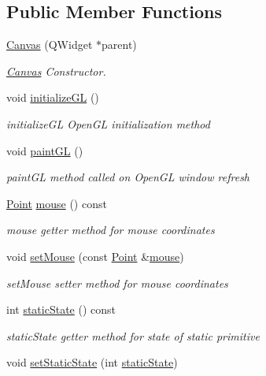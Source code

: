 \subsection*{Public Member Functions}
\begin{DoxyCompactItemize}
\item 
\hyperlink{class_canvas_a8e5bf913d99dcf0511aaa5fd8c294cde}{Canvas} (Q\+Widget $\ast$parent)
\begin{DoxyCompactList}\small\item\em \hyperlink{class_canvas}{Canvas} Constructor. \end{DoxyCompactList}\item 
void \hyperlink{class_canvas_a68622ac24f847a47270c4e6f566eec3c}{initialize\+GL} ()
\begin{DoxyCompactList}\small\item\em initialize\+GL Open\+GL initialization method \end{DoxyCompactList}\item 
void \hyperlink{class_canvas_a4e9439400dd404eda24cf42ca5ca9972}{paint\+GL} ()
\begin{DoxyCompactList}\small\item\em paint\+GL method called on Open\+GL window refresh \end{DoxyCompactList}\item 
\hyperlink{class_point}{Point} \hyperlink{class_canvas_a5c78c7a84c0f9d5540caeab66b677299}{mouse} () const
\begin{DoxyCompactList}\small\item\em mouse getter method for mouse coordinates \end{DoxyCompactList}\item 
void \hyperlink{class_canvas_a104679999425d8ffdc27454b71e5e1e3}{set\+Mouse} (const \hyperlink{class_point}{Point} \&\hyperlink{class_canvas_a5c78c7a84c0f9d5540caeab66b677299}{mouse})
\begin{DoxyCompactList}\small\item\em set\+Mouse setter method for mouse coordinates \end{DoxyCompactList}\item 
int \hyperlink{class_canvas_a63f657b762d08168f52630bc49efbf71}{static\+State} () const
\begin{DoxyCompactList}\small\item\em static\+State getter method for state of static primitive \end{DoxyCompactList}\item 
void \hyperlink{class_canvas_a6c42c7c65e5eae64c4fa1839146f0440}{set\+Static\+State} (int \hyperlink{class_canvas_a63f657b762d08168f52630bc49efbf71}{static\+State})

\end{DoxyCompactItemize}
